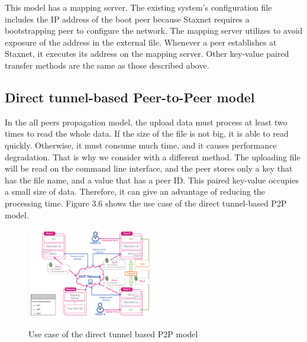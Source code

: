 This model has a mapping server. The existing system's configuration file includes the IP address of the boot peer because Staxnet requires a bootstrapping peer to configure the network. The mapping server utilizes to avoid exposure of the address in the external file. Whenever a peer establishes at Staxnet, it executes its address on the mapping server. Other key-value paired transfer methods are the same as those described above.

\subsection{Direct tunnel-based Peer-to-Peer model}

In the all peers propagation model, the upload data must process at least two times to read the whole data. If the size of the file is not big, it is able to read quickly. Otherwise, it must consume much time, and it causes performance degradation. That is why we consider with a different method. The uploading file will be read on the command line interface, and the peer stores only a key that has the file name, and a value that has a peer ID. This paired key-value occupies a small size of data. Therefore, it can give an advantage of reducing the processing time. Figure 3.6 shows the use case of the direct tunnel-based P2P model.

\begin{figure}[!ht]
	\centering
	\includegraphics[width=0.5\textwidth]{images/fig_3_6.pdf}\\
	\caption{Use case of the direct tunnel based P2P model}
	\label{fig:tunnel}
\end{figure}

